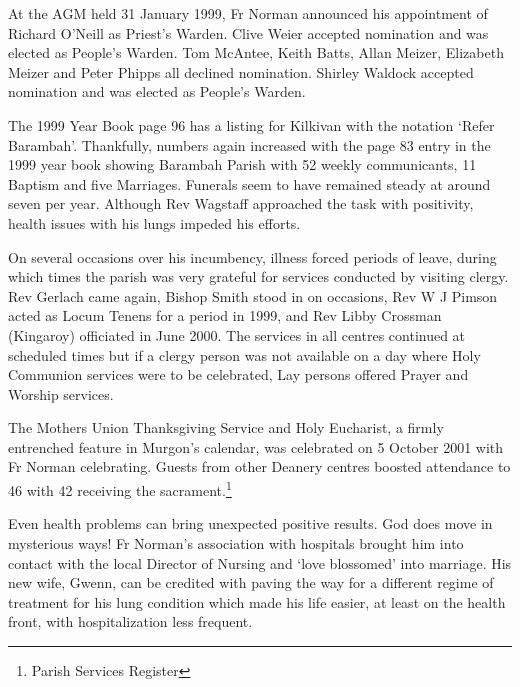 At the AGM held 31 January 1999, Fr Norman announced his appointment of Richard O'Neill as Priest's Warden. Clive Weier accepted nomination and was elected as People's Warden. Tom McAntee, Keith Batts, Allan Meizer, Elizabeth Meizer and Peter Phipps all declined nomination. Shirley Waldock accepted nomination and was elected as People's Warden.



The 1999 Year Book page 96 has a listing for Kilkivan with the notation `Refer Barambah'. Thankfully, numbers again increased with the page 83 entry in the 1999 year book showing Barambah Parish with 52 weekly communicants, 11 Baptism and five Marriages. Funerals seem to have remained steady at around seven per year. Although Rev Wagstaff approached the task with positivity, health issues with his lungs impeded his efforts.



On several occasions over his incumbency, illness forced periods of leave, during which times the parish was very grateful for services conducted by visiting clergy. Rev Gerlach came again, Bishop Smith stood in on occasions, Rev W J Pimson acted as Locum Tenens for a period in 1999, and Rev Libby Crossman (Kingaroy) officiated in June 2000. The services in all centres continued at scheduled times but if a clergy person was not available on a day where Holy Communion services were to be celebrated, Lay persons offered Prayer and Worship services.



The Mothers Union Thanksgiving Service and Holy Eucharist, a firmly entrenched feature in Murgon's calendar, was celebrated on 5 October 2001 with Fr Norman celebrating. Guests from other Deanery centres boosted attendance to 46 with 42 receiving the sacrament.\footnote{Parish Services Register}


Even health problems can bring unexpected positive results. God does move in mysterious ways! Fr Norman's association with hospitals brought him into contact with the local Director of Nursing and `love blossomed' into marriage. His new wife, Gwenn, can be credited with paving the way for a different regime of treatment for his lung condition which made his life easier, at least on the health front, with hospitalization less frequent.



